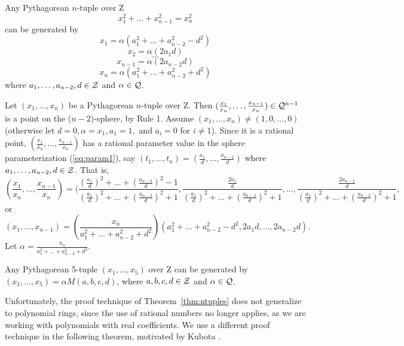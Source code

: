 \begin{theorem}
\label{thm:ntuples}
Any Pythagorean $n$-tuple over {\cal Z}
\[
	x_1^2 + \ldots + x_{n-1}^2 = x_n^2
\]
can be generated by 
\[
	x_1 = \alpha (a_1^2+\ldots+a_{n-2}^2-d^2)
\]
\[
	x_2 = \alpha (2a_1d)
\]
\[
	\ldots
\]
\[
	x_{n-1} = \alpha (2a_{n-2}d)
\]
\[
	x_n = \alpha (a_1^2+\ldots+a_{n-2}^2+d^2)
\]
where $a_1,\ldots,a_{n-2},d \in {\cal Z}$ and $\alpha \in {\cal Q}$.
\end{theorem}
\prf
Let $(x_1,\ldots,x_n)$ be a Pythagorean $n$-tuple over {\cal Z}.
Then $(\frac{x_1}{x_n},\ldots,\frac{x_{n-1}}{x_n}) \in {\cal Q}^{n-1}$ 
is a point on the ($n-2$)-sphere, by Rule 1.
Assume $(x_1,\ldots,x_n) \neq (1,0,\ldots,0)$
(otherwise let $d=0, \alpha = x_1, a_1=1, \mbox{ and } a_i = 0$ for $i\neq 1$).
Since it is a rational point, $(\frac{x_1}{x_n},\ldots,\frac{x_{n-1}}{x_n})$
has a rational parameter value in the sphere parameterization (\ref{eq:param1}),
say $(t_1,\ldots,t_n) = (\frac{a_1}{d},\ldots,\frac{a_{n-2}}{d})$
where $a_1,\ldots,a_{n-2},d \in {\cal Z}$.
That is,
\[
 (\frac{x_1}{x_n},\ldots,\frac{x_{n-1}}{x_n})
 = (\frac{(\frac{a_1}{d})^2 + \ldots + (\frac{a_{n-2}}{d})^2 - 1}
         {(\frac{a_1}{d})^2 + \ldots + (\frac{a_{n-2}}{d})^2 + 1},
    \frac{\frac{2a_1}{d}}
         {(\frac{a_1}{d})^2 + \ldots + (\frac{a_{n-2}}{d})^2 + 1},
    \ldots,
    \frac{\frac{2a_{n-2}}{d}}
         {(\frac{a_1}{d})^2 + \ldots + (\frac{a_{n-2}}{d})^2 + 1},
\]
or
\[
(x_1,\ldots,x_{n-1}) = 
(\frac{x_n}{a_1^2 + \ldots + a_{n-2}^2 + d^2})
(a_1^2 + \ldots + a_{n-2}^2 - d^2, 2a_1 d, \ldots, 2a_{n-2} d).
\]
Let $\alpha = \frac{x_n}{a_1^2 + \ldots + a_{n-2}^2 + d^2}$.
\QED

\begin{corollary}
Any Pythagorean 5-tuple $(x_1,\ldots,x_5)$ over {\cal Z} can be generated
by $(x_1,\ldots,x_5) = \alpha M(a,b,c,d)$,
where $a,b,c,d \in {\cal Z}$ and $\alpha \in {\cal Q}$.
\end{corollary}



Unfortunately, the proof technique of Theorem~\ref{thm:ntuples} 
does not generalize to polynomial rings,
since the use of rational numbers no longer applies, as we are working
with polynomials with real coefficients.
We use a different proof technique in the following theorem, motivated
by Kubota \cite{kubota72}.

